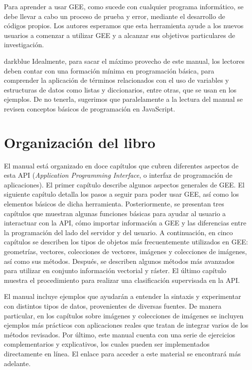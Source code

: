 \documentclass[
  12pt,
  letterpaper,
  twoside]{book}
\begin{document}
Para aprender a usar GEE, como sucede con cualquier programa informático, se debe llevar a cabo un proceso de prueba y error, mediante el desarrollo de códigos propios. Los autores esperamos que esta herramienta ayude a los nuevos usuarios a comenzar a utilizar GEE y a alcanzar sus objetivos particulares de investigación.

\begin{bluebox2}

\begin{awesomeblock}{5pt}{\faLightbulb}{darkblue}
Idealmente, para sacar el máximo provecho de este manual, los lectores deben contar con una formación mínima en programación básica, para comprender la aplicación de términos relacionados con el uso de variables y estructuras de datos como listas y diccionarios, entre otras, que se usan en los ejemplos. De no tenerla, sugerimos que paralelamente a la lectura del manual se revisen conceptos básicos de programación en JavaScript.

\end{awesomeblock}

\end{bluebox2}

\hypertarget{organizaciuxf3n-del-libro}{%
\section{Organización del libro}\label{organizaciuxf3n-del-libro}}

El manual está organizado en doce capítulos que cubren diferentes aspectos de esta API (\emph{Application Programming Interface}, o interfaz de programación de aplicaciones). El primer capítulo describe algunos aspectos generales de GEE. El siguiente capítulo detalla los pasos a seguir para poder usar GEE, así como los elementos básicos de dicha herramienta. Posteriormente, se presentan tres capítulos que muestran algunas funciones básicas para ayudar al usuario a interactuar con la API, cómo importar información a GEE y las diferencias entre la programación del lado del servidor y del usuario. A continuación, en cinco capítulos se describen los tipos de objetos más frecuentemente utilizados en GEE: geometrías, vectores, colecciones de vectores, imágenes y colecciones de imágenes, así como sus métodos. Después, se describen algunos métodos más avanzados para utilizar en conjunto información vectorial y ráster. El último capítulo muestra el procedimiento para realizar una clasificación supervisada en la API.

El manual incluye ejemplos que ayudarán a entender la sintaxis y experimentar con distintos tipos de datos, provenientes de diversas fuentes. De manera particular, en los capítulos sobre imágenes y colecciones de imágenes se incluyen ejemplos más prácticos con aplicaciones reales que tratan de integrar varios de los métodos revisados. Por último, este manual cuenta con una serie de ejercicios complementarios y explicativos, los cuales pueden ser implementados directamente en línea. El enlace para acceder a este material se encontrará más adelante.
\end{document}
